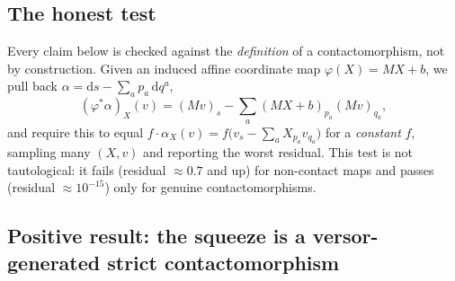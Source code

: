 \documentclass[11pt]{article}
\newcommand{\dif}{\mathrm{d}}
\begin{document}
\subsection{The honest test}

Every claim below is checked against the \emph{definition} of a contactomorphism, not by construction. Given an induced affine coordinate map $\varphi(X)=MX+b$, we pull back $\alpha = \dif s - \sum_a p_a\,\dif q^a$,
\begin{equation}
(\varphi^*\alpha)_X(v) = (Mv)_s - \sum_a (MX+b)_{p_a}(Mv)_{q_a},
\end{equation}
and require this to equal $f\cdot\alpha_X(v) = f\big(v_s - \sum_a X_{p_a}v_{q_a}\big)$ for a \emph{constant} $f$, sampling many $(X,v)$ and reporting the worst residual. This test is not tautological: it fails (residual $\approx 0.7$ and up) for non-contact maps and passes (residual $\approx 10^{-15}$) only for genuine contactomorphisms.

\subsection{Positive result: the squeeze is a versor-generated strict contactomorphism}
\end{document}
